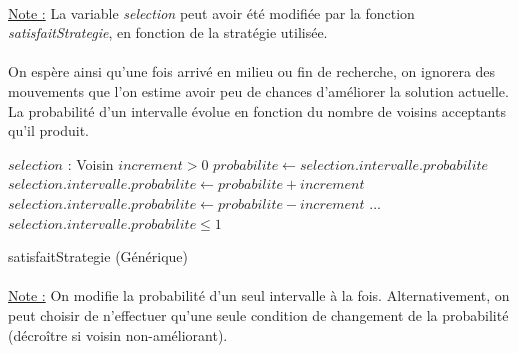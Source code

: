 \documentclass[a4paper,10pt]{report}
\begin{document}
\paragraph{}
\underline{Note :} La variable \textit{selection} peut avoir été modifiée par la
fonction \textit{satisfaitStrategie}, en fonction de la stratégie utilisée.

\paragraph{}
  On espère ainsi qu'une fois arrivé en milieu ou fin de recherche, on ignorera
des mouvements que l'on estime avoir peu de chances d'améliorer la solution
actuelle. La probabilité d'un intervalle évolue en fonction du nombre de voisins
acceptants qu'il produit.


\begin{algorithm}[h]
  \begin{algorithmic}
    \Require $selection$ : Voisin
    \Require $increment > 0$
    \State 
    \State $probabilite \gets selection.intervalle.probabilite$
      \State $selection.intervalle.probabilite \gets probabilite + increment$
    \Else
      \State $selection.intervalle.probabilite \gets probabilite - increment$
    \EndIf
    \State ...
    \Ensure $selection.intervalle.probabilite \leq 1$
  \end{algorithmic}
  \caption{satisfaitStrategie (Générique)}
\end{algorithm}

\paragraph{}
\underline{Note :} On modifie la probabilité d'un seul intervalle à la fois.
Alternativement, on peut choisir de n'effectuer qu'une seule condition de
changement de la probabilité (décroître si voisin non-améliorant).
\end{document}
